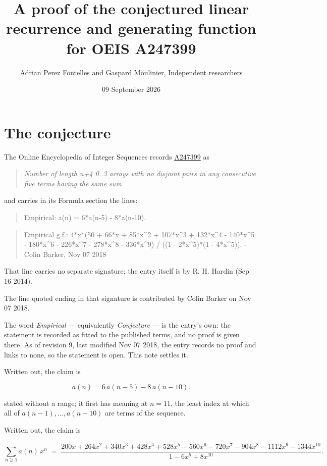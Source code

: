 \documentclass[11pt]{article}
\title{A proof of the conjectured linear recurrence and generating function for OEIS A247399}
\author{Adrian Perez Fontelles and Gaspard Moulinier, Independent researchers}
\date{09 September 2026}
\theoremstyle{definition}
\begin{document}
\maketitle
\section{The conjecture}

The Online Encyclopedia of Integer Sequences records \href{https://oeis.org/A247399}{A247399} as

\begin{quote}\itshape Number of length n+4 0..3 arrays with no disjoint pairs in any consecutive five terms having the same sum\end{quote}

and carries in its Formula section the lines:

\begin{quote}\ttfamily Empirical: a(n) = 6*a(n-5) - 8*a(n-10).\end{quote}

\begin{quote}\ttfamily Empirical g.f.: 4*x*(50 + 66*x + 85*x\textasciicircum{}2 + 107*x\textasciicircum{}3 + 132*x\textasciicircum{}4 - 140*x\textasciicircum{}5 - 180*x\textasciicircum{}6 - 226*x\textasciicircum{}7 - 278*x\textasciicircum{}8 - 336*x\textasciicircum{}9) / ((1 - 2*x\textasciicircum{}5)*(1 - 4*x\textasciicircum{}5)). - Colin Barker, Nov 07 2018\end{quote}

That line carries no separate signature; the entry itself is by R. H. Hardin (Sep 16 2014).

The line quoted ending in that signature is contributed by Colin Barker on Nov 07 2018.

The word {\itshape Empirical} --- equivalently {\itshape Conjecture} --- is the entry's own: the statement is recorded as fitted to the published terms, and no proof is given there. As of revision 9, last modified Nov 07 2018, the entry records no proof and links to none, so the statement is open. This note settles it.

Written out, the claim is

\[a(n) = 6\,a(n-5) - 8\,a(n-10).\]

stated without a range; it first has meaning at $n = 11$, the least index at which all of $a(n-1),\dots,a(n-10)$ are terms of the sequence.

Written out, the claim is

\[\sum_{n \ge 1} a(n)\,x^n \;=\; \frac{200x + 264x^{2} + 340x^{3} + 428x^{4} + 528x^{5} - 560x^{6} - 720x^{7} - 904x^{8} - 1112x^{9} - 1344x^{10}}{1 - 6x^{5} + 8x^{10}}.\]
\end{document}

